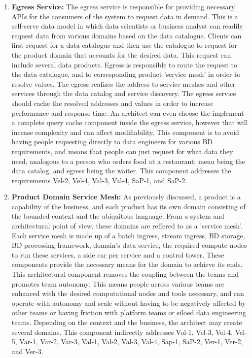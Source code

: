 \documentclass[review]{elsarticle}
\begin{document}
\begin{enumerate}
    \item \textbf{Egress Service:} The egress service is responsible for providing necessary APIs for the consumers of the system to request data in demand. This is a self-serve data model in which data scientists or business analyst can readily request data from various domains based on the data catalogue. Clients can first request for a data catalogue and then use the catalogue to request for the product domain that accounts for the desired data. This request can include several data products. Egress is responsible to route the request to the data catalogue, and to corresponding product 'service mesh' in order to resolve values. The egress realizes the address to service meshes and other services through the data catalog and service discovery. The egress service should cache the resolved addresses and values in order to increase performance and response time. An architect can even choose the implement a complete query cache component inside the egress service, however that will incease complexity and can affect modifiability. This component is to avoid having people requesting directly to data engineers for various BD requirements, and means that people can just request for what data they need, analogous to a person who orders food at a restaurant; menu being the data catalog, and egress being the waiter. This component addresses the requirements Vel-2, Vel-4, Val-3, Val-4, SaP-1, and SaP-2.
    \item \textbf{Product Domain Service Mesh:} As previously discussed, a product is a capability of the business, and each product has its own domain consisting of the bounded context and the ubiquitous language. From a system and architectural point of view, these domains are reffered to as a 'service mesh'. Each service mesh is made up of a batch ingress, stream ingress, BD storage, BD processing framework, domain's data service, the required compute nodes to run these services, a side car per service and a control tower. These components provide the necessary means for the domain to achieve its ends. This architectural component removes the coupling between the teams and promotes team autonomy. This means people across various teams are enhanced with the desired computational nodes and tools necessary, and can operate with autonomy and scale without having to be negatively affected by other teams or having friction with platform teams or siloed data engineering teams. Depending on the context and the business, the architect may create several domains. This component indirectly addresses Vol-1, Vel-3, Vel-4, Vel-5, Var-1, Var-2, Var-3, Val-1, Val-2, Val-3, Val-4, Sap-1, SaP-2, Ver-1, Ver-2, and Ver-3.
    

\end{enumerate}
\end{document}
